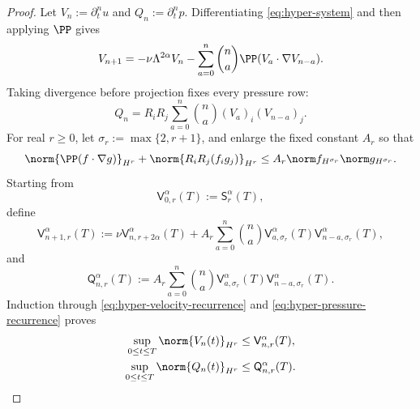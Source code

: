 \begin{proof}
Let \(V_n:=\partial_t^nu\) and \(Q_n:=\partial_t^np\).  Differentiating
\eqref{eq:hyper-system} and then applying \(\PP\) gives
\begin{equation}
 V_{n+1}
 =-\nu\Lambda^{2\alpha}V_n
 -\sum_{a=0}^n\binom na
   \PP(V_a\cdot\nabla V_{n-a}).
 \label{eq:hyper-velocity-recurrence}
\end{equation}
Taking divergence before projection fixes every pressure row:
\begin{equation}
 Q_n
 =R_iR_j\sum_{a=0}^n\binom na
   (V_a)_i(V_{n-a})_j.
 \label{eq:hyper-pressure-recurrence}
\end{equation}
For real \(r\ge0\), let \(\sigma_r:=\max\{2,r+1\}\), and enlarge the
fixed constant \(A_r\) so that
\begin{equation}
 \norm{\PP(f\cdot\nabla g)}_{H^r}
 +\norm{R_iR_j(f_i g_j)}_{H^r}
 \le A_r\norm f_{H^{\sigma_r}}\norm g_{H^{\sigma_r}}.
 \label{eq:hyper-row-product}
\end{equation}
Starting from
\begin{equation}
 \mathsf V_{0,r}^\alpha(T):=\mathsf S_r^\alpha(T),
 \label{eq:hyper-row-base}
\end{equation}
define
\begin{equation}
 \mathsf V_{n+1,r}^\alpha(T)
 :=\nu\mathsf V_{n,r+2\alpha}^\alpha(T)
 +A_r\sum_{a=0}^n\binom na
   \mathsf V_{a,\sigma_r}^\alpha(T)
   \mathsf V_{n-a,\sigma_r}^\alpha(T),
 \label{eq:hyper-row-recursion}
\end{equation}
and
\begin{equation}
 \mathsf Q_{n,r}^\alpha(T)
 :=A_r\sum_{a=0}^n\binom na
   \mathsf V_{a,\sigma_r}^\alpha(T)
   \mathsf V_{n-a,\sigma_r}^\alpha(T).
 \label{eq:hyper-pressure-envelope}
\end{equation}
Induction through \eqref{eq:hyper-velocity-recurrence} and
\eqref{eq:hyper-pressure-recurrence} proves
\begin{align}
 \sup_{0\le t\le T}\norm{V_n(t)}_{H^r}
 &\le\mathsf V_{n,r}^\alpha(T),
 \label{eq:hyper-row-bound}\\
 \sup_{0\le t\le T}\norm{Q_n(t)}_{H^r}
 &\le\mathsf Q_{n,r}^\alpha(T).
 \label{eq:hyper-pressure-bound}
\end{align}


\end{proof}
